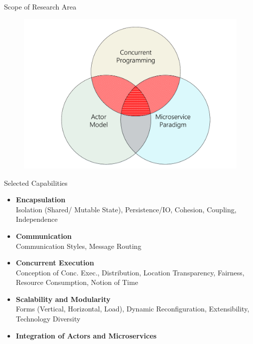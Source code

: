 \documentclass{beamer}
\begin{document}

\begin{frame}{Scope of Research Area}

\pause

\begin{center}
  \begin{figure} 
    \includegraphics[width=\textwidth]{graphics/topics-venn.pdf} 
  \end{figure}
\end{center}

\end{frame}


\begin{frame}{Selected Capabilities}

\begin{itemize}
  \item \textbf{Encapsulation} \\%
        Isolation (Shared/ Mutable State), Persistence/IO, Cohesion, Coupling, Independence
  \item \textbf{Communication} \\%
        Communication Styles, Message Routing
  \item \textbf{Concurrent Execution} \\%
        Conception of Conc. Exec., Distribution, Location Transparency, Fairness, Resource Consumption, Notion of Time
  \item \textbf{Scalability and Modularity} \\%
        Forms (Vertical, Horizontal, Load), Dynamic Reconfiguration, Extensibility, Technology Diversity
  \item \textbf{Integration of Actors and Microservices}
\end{itemize}

\end{frame}
\end{document}
